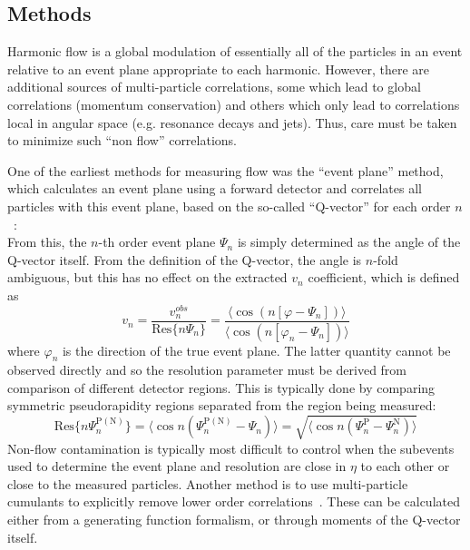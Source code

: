 \subsection{Methods}
\label{subsect:pas:flow:methods}
Harmonic flow is a global modulation of essentially all of the particles in an event relative to an event plane
appropriate to each harmonic.  However, there are additional sources of multi-particle correlations, some which
lead to global correlations (momentum conservation) and others which only lead to correlations local in angular space
(e.g. resonance decays and jets).  Thus, care must be taken to minimize such ``non flow'' correlations.

One of the earliest methods for measuring flow was the ``event plane'' method, which calculates an event plane using
a forward detector and correlates all particles with this event plane, based on the so-called ``Q-vector'' for each order $n$~\cite{Poskanzer:1998yz}:
\begin{equation}
\end{equation}
From this, the $n$-th order event plane $\Psi_n$ is simply determined as the angle of the Q-vector itself.
From the definition of the Q-vector, the angle is $n$-fold ambiguous, but this has no effect on the extracted
$v_n$ coefficient, which is defined as
\begin{equation}
v_n = \frac{v^{obs}_n}{\mathrm{Res}\{ n \Psi_n \}} = \frac{ \langle \cos ( n [\varphi - \Psi_n] ) \rangle }{ \langle \cos ( n [\varphi_n - \Psi_n] ) \rangle    }
\end{equation}
where $\varphi_n$ is the direction of the true event plane.  The latter quantity cannot be observed directly and so the
resolution parameter must be derived from comparison of different detector regions.  This is typically done by comparing
symmetric pseudorapidity regions separated from the region being measured:
\begin{equation}
\mathrm{Res} \{ n \Psi_n^{\mathrm{P(N)}} \} =
\langle \cos n ( \Psi_n^{\mathrm{P(N)}} - \Psi_n ) \rangle =
\sqrt{ \langle \cos n ( \Psi_n^{\mathrm{P}} - \Psi_n^{\mathrm{N}} ) \rangle }
\end{equation}
Non-flow contamination is typically most difficult to control when the subevents used to determine the event plane
and resolution are close in $\eta$ to each other or close to the measured particles.
%
Another method is to use multi-particle cumulants to explicitly remove lower order 
correlations~\cite{Borghini:2000sa,Borghini:2001vi,Borghini:2001zr,Bilandzic:2010jr}.
These can be calculated either from a generating function formalism, or through moments of the Q-vector itself.
